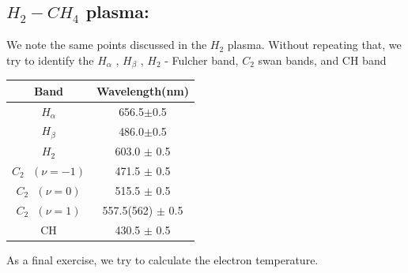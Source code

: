 \documentclass[]{report}[12 pt]
\begin{document}
\subsection*{$H_2-CH_4$ plasma:}
We note the same points discussed in the $H_2$ plasma. Without repeating that, we try to identify the $H_\alpha$ , $H_\beta$ , $H_2$  - Fulcher band, $C_2$ swan bands, and CH band\\
\begin{center}
	\begin{tabular}{|c|c|}
		\hline
		Band & Wavelength(nm) \\
		\hline
		$H_\alpha$ & 656.5$\pm$0.5 \\
		\hline
		$H_\beta$ & 486.0$\pm$0.5 \\
		\hline
		$H_2$ & 603.0 $\pm$ 0.5 \\
		\hline
		$C_2\text{ }(\nu =-1)$ & 471.5 $\pm$ 0.5 \\
		\hline
		$C_2\text{ }(\nu =0)$ & 515.5 $\pm$ 0.5 \\
		\hline
		$C_2\text{ }(\nu =1)$ & 557.5(562) $\pm$ 0.5 \\
		\hline
		CH & 430.5 $\pm$ 0.5 \\
		\hline
	\end{tabular}
\end{center}
As a final exercise, we try to calculate the electron temperature.
\end{document}

